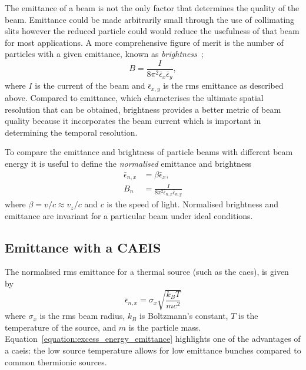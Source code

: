 The emittance of a beam is not the only factor that determines the quality of the beam.
Emittance could be made arbitrarily small through the use of collimating slits however the reduced particle could would reduce the usefulness of that beam for most applications.
A more comprehensive figure of merit is the number of particles with a given emittance, known as \emph{brightness}~\cite{reiser_theory_2008};
\begin{equation}
B = \frac{I}{8\pi^2\bar{\epsilon}_x\bar{\epsilon}_y},
\end{equation}
where $I$ is the current of the beam and $\bar{\epsilon}_{x,y}$ is the \gls{rms} emittance as described above.
Compared to emittance, which characterises the ultimate spatial resolution that can be obtained, brightness provides a better metric of beam quality because it incorporates the beam current which is important in determining the temporal resolution.

To compare the emittance and brightness of particle beams with different beam energy it is useful to define the \emph{normalised} emittance and brightness
\begin{align}
\bar{\epsilon}_{n,x} &= \beta\bar{\epsilon}_x,\\
B_n &= \frac{I}{8\pi^2\bar{\epsilon}_{n,x}\bar{\epsilon}_{n,y}}
\end{align}
where $\beta=v/c\approx v_z/c$ and $c$ is the speed of light.
Normalised brightness and emittance are invariant for a particular beam under ideal conditions.

\subsection{Emittance with a CAEIS}
\label{section:excess_energy_emittance}

The normalised \gls{rms} emittance for a thermal source (such as the \gls{caes}), is given by~\cite{mcculloch_high-coherence_2013}
\begin{equation}\label{equation:excess_energy_emittance}
\bar{\epsilon}_{n,x} = \sigma_x \sqrt{\frac{k_B T}{m c^2}}
\end{equation}
where $\sigma_x$ is the \gls{rms} beam radius, $k_B$ is Boltzmann's constant, $T$ is the temperature of the source, and $m$ is the particle mass.
Equation~\ref{equation:excess_energy_emittance} highlights one of the advantages of a \gls{caeis}: the low source temperature allows for low emittance bunches compared to common thermionic sources.

